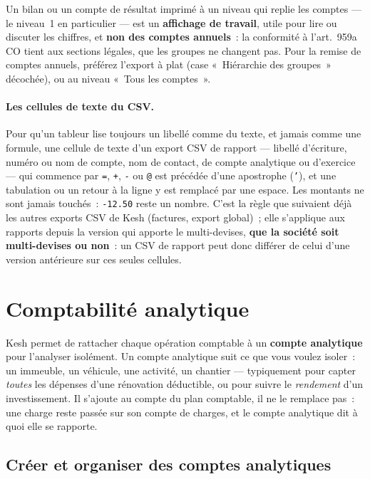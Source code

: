 \documentclass[a4paper,11pt,oneside]{article}
\begin{document}
\begin{keshwarning}
Un bilan ou un compte de résultat imprimé à un niveau qui replie les comptes --- le niveau~1 en
particulier --- est un \textbf{affichage de travail}, utile pour lire ou discuter les chiffres, et
\textbf{non des comptes annuels}~: la conformité à l'art.~959a CO tient aux sections légales, que
les groupes ne changent pas. Pour la remise de comptes annuels, préférez l'export à plat (case «~Hiérarchie des groupes~» décochée), ou au
niveau «~Tous les comptes~».
\end{keshwarning}

\paragraph{Les cellules de texte du CSV.} Pour qu'un tableur lise toujours un libellé comme du
texte, et jamais comme une formule, une cellule de texte d'un export CSV de rapport --- libellé
d'écriture, numéro ou nom de compte, nom de contact, de compte analytique ou d'exercice --- qui
commence par \texttt{=}, \texttt{+}, \texttt{-} ou \texttt{@} est précédée d'une apostrophe
(\texttt{'}), et une tabulation ou un retour à la ligne y est remplacé par une espace. Les montants
ne sont jamais touchés~: \texttt{-12.50} reste un nombre. C'est la règle que suivaient déjà les
autres exports CSV de Kesh (factures, export global)~; elle s'applique aux rapports depuis la
version qui apporte le multi-devises, \textbf{que la société soit multi-devises ou non}~: un CSV de
rapport peut donc différer de celui d'une version antérieure sur ces seules cellules.

\section{Comptabilité analytique}

Kesh permet de rattacher chaque opération comptable à un \textbf{compte analytique} pour
l'analyser isolément. Un compte analytique suit ce que vous voulez isoler~: un immeuble, un
véhicule, une activité, un chantier --- typiquement pour capter \emph{toutes} les dépenses
d'une rénovation déductible, ou pour suivre le \emph{rendement} d'un investissement. Il
s'ajoute au compte du plan comptable, il ne le remplace pas~: une charge reste passée sur son
compte de charges, et le compte analytique dit à quoi elle se rapporte.

\subsection{Créer et organiser des comptes analytiques}
\end{document}
